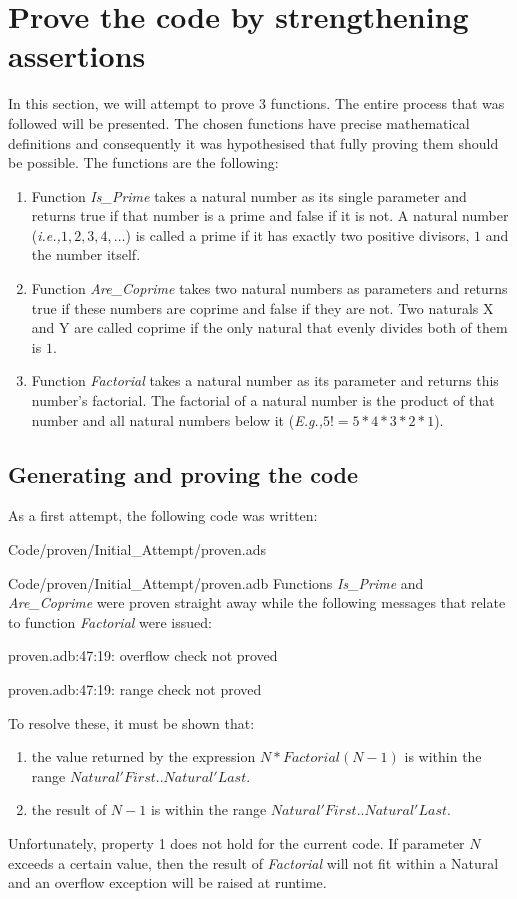 \documentclass{llncs}
\newcommand{\ie}{\textit{i.e.,}\xspace}
\newcommand{\Eg}{\textit{E.g.,}\xspace}
\begin{document}
\section{Prove the code by strengthening assertions}
In this section, we will attempt to prove 3 functions. The entire process that
was followed will be presented. The chosen functions have precise mathematical
definitions and consequently it was hypothesised that fully proving them should
be possible. The functions are the following:
\begin{enumerate}
  \item Function \emph{Is\_Prime} takes a natural number as its single parameter
    and returns true if that number is a prime and false if it is not. A natural
    number (\ie $1, 2, 3, 4, \dots$) is called a prime if it has exactly two
    positive divisors, $1$ and the number itself.

  \item Function \emph{Are\_Coprime} takes two natural numbers as parameters and returns
    true if these numbers are coprime and false if they are not. Two naturals X and Y
    are called coprime if the only natural that evenly divides both of them is $1$.

  \item Function \emph{Factorial} takes a natural number as its parameter and returns
    this number's factorial. The factorial of a natural number is the product of that
    number and all natural numbers below it (\Eg $5! = 5 * 4 * 3 * 2 * 1$).
\end{enumerate}

\subsection{Generating and proving the code}
As a first attempt, the following code was written:

                {Code/proven/Initial_Attempt/proven.ads}

                {Code/proven/Initial_Attempt/proven.adb}
Functions \emph{Is\_Prime} and \emph{Are\_Coprime} were proven straight away while the
following messages that relate to function \emph{Factorial} were issued:

proven.adb:47:19: overflow check not proved

proven.adb:47:19: range check not proved

\noindent
To resolve these, it must be shown that:
\begin{enumerate}
  \item the value returned by the expression $N * Factorial (N - 1)$ is within
    the range $Natural'First .. Natural'Last$.

  \item the result of $N - 1$ is within the range $Natural'First .. Natural'Last$.
\end{enumerate}
Unfortunately, property 1 does not hold for the current code. If parameter
$N$ exceeds a certain value, then the result of \emph{Factorial} will not fit
within a Natural and an overflow exception will be raised at runtime.
\end{document}
